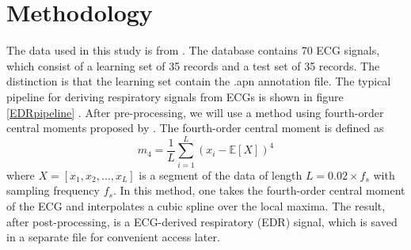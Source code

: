 \section{Methodology}
The data used in this study is from \textcite{pollard_physionet_2026}. The database contains 70 ECG signals, which consist of a learning set of 35 records and a test set of 35 records. The distinction is that the learning set contain the .apn annotation file.
\nl
The typical pipeline for deriving respiratory signals from ECGs is shown in figure \ref{EDRpipeline} \cite{akaiReducingRespiratoryArtifacts2026}. After pre-processing, we will use a method using fourth-order central moments proposed by \textcite{schmidtEstimationRespiratorySignal2015}. The fourth-order central moment is defined as
\begin{equation*}
      m_4 = \frac1L \sum_{i=1}^{L} (x_i - \mathbb{E}[X])^4
\end{equation*} 
where $X=[x_1,x_2,\dots,x_L]$ is a segment of the data of length $L=0.02\times f_s$ with sampling frequency $f_s$.
In this method, one takes the fourth-order central moment of the ECG and interpolates a cubic spline over the local maxima. 
The result, after post-processing, is a ECG-derived respiratory (EDR) signal, which is saved in a separate file for convenient access later.

